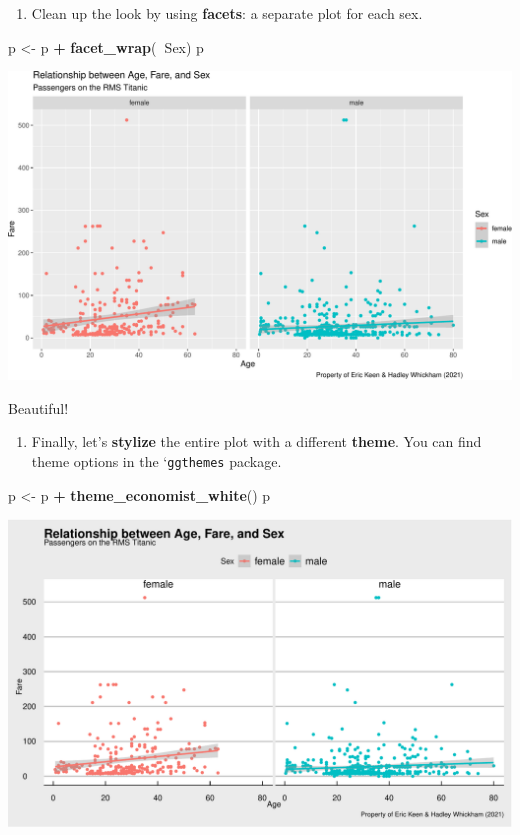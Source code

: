\documentclass[]{book}
\newenvironment{Shaded}{\begin{snugshade}}{\end{snugshade}}
\newcommand{\KeywordTok}[1]{\textcolor[rgb]{0.13,0.29,0.53}{\textbf{#1}}}
\newcommand{\NormalTok}[1]{#1}
\newcommand{\OperatorTok}[1]{\textcolor[rgb]{0.81,0.36,0.00}{\textbf{#1}}}
\newcommand{\StringTok}[1]{\textcolor[rgb]{0.31,0.60,0.02}{#1}}
\providecommand{\tightlist}{%
  \setlength{\itemsep}{0pt}\setlength{\parskip}{0pt}}
\begin{document}
\begin{enumerate}
\def\labelenumi{(\arabic{enumi})}
\setcounter{enumi}{6}
\tightlist
\item
  Clean up the look by using \textbf{facets}: a separate plot for each sex.
\end{enumerate}

\begin{Shaded}
\begin{Highlighting}[]
\NormalTok{p <-}\StringTok{ }\NormalTok{p }\OperatorTok{+}\StringTok{ }\KeywordTok{facet_wrap}\NormalTok{(}\OperatorTok{~}\NormalTok{Sex)}
\NormalTok{p}
\end{Highlighting}
\end{Shaded}

\includegraphics{figures/unnamed-chunk-254-1.pdf}

Beautiful!

\begin{enumerate}
\def\labelenumi{(\arabic{enumi})}
\setcounter{enumi}{7}
\tightlist
\item
  Finally, let's \textbf{stylize} the entire plot with a different \textbf{theme}. You can find theme options in the `\texttt{ggthemes} package.
\end{enumerate}

\begin{Shaded}
\begin{Highlighting}[]
\NormalTok{p <-}\StringTok{ }\NormalTok{p }\OperatorTok{+}\StringTok{ }\KeywordTok{theme_economist_white}\NormalTok{()}
\NormalTok{p}
\end{Highlighting}
\end{Shaded}

\includegraphics{figures/unnamed-chunk-255-1.pdf}
\end{document}
